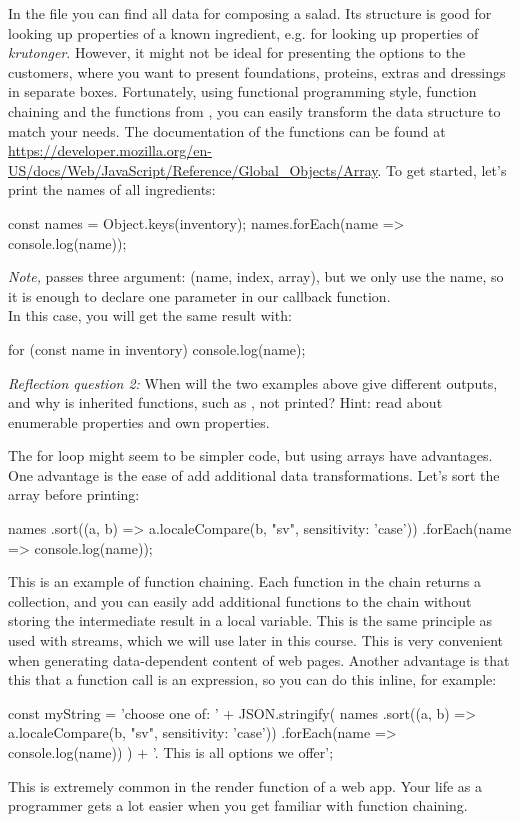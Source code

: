 \documentclass[fleqn, article, a4paper]{memoir}
\begin{document}
\begin{Assignments}
\item In the  file you can find all data for composing a salad. Its structure is good for looking up properties of a known ingredient, e.g.  for looking up properties of \emph{krutonger}. However, it might not be ideal for presenting the options to the customers, where you want to present foundations, proteins, extras and dressings in separate boxes. Fortunately, using functional programming style, function chaining and the functions from , you can easily transform the data structure to match your needs. The documentation of the functions can be found at \url{https://developer.mozilla.org/en-US/docs/Web/JavaScript/Reference/Global_Objects/Array}. To get started, let's print the names of all ingredients:
\begin{Code}
const names = Object.keys(inventory);
names.forEach(name => console.log(name));
\end{Code}
\emph{Note,}  passes three argument: (name, index, array), but we only use the name, so it is enough to declare one parameter in our callback function.
\\In this case, you will get the same result with:
\begin{Code}
for (const name in inventory) {
  console.log(name);
}
\end{Code}
\emph{Reflection question 2:} When will the two examples above give different outputs, and why is inherited functions, such as , not printed? Hint: read about enumerable properties and own properties.

The for loop might seem to be simpler code, but using arrays have advantages. One advantage is the ease of add additional data transformations. Let's sort the array before printing:
\begin{Code}
names
.sort((a, b) => a.localeCompare(b, "sv", {sensitivity: 'case'}))
.forEach(name => console.log(name));
\end{Code}
This is an example of function chaining. Each function in the chain returns a collection, and you can easily add additional functions to the chain without storing the intermediate result in a local variable. This is the same principle as used with streams, which we will use later in this course. This is very convenient when generating data-dependent content of web pages. Another advantage is that this that a function call is an expression, so you can do this inline, for example:
\begin{Code}
const myString = 'choose one of: ' + JSON.stringify(
names
.sort((a, b) => a.localeCompare(b, "sv", {sensitivity: 'case'}))
.forEach(name => console.log(name))
) + '. This is all options we offer';
\end{Code}
\noindent This is extremely common in the render function of a web app. Your life as a programmer gets a lot easier when you get familiar with function chaining.


\end{Assignments}
\end{document}
